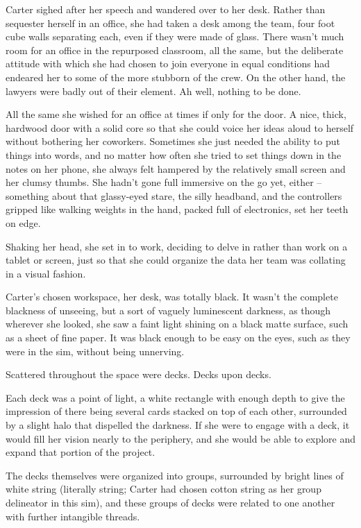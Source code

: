 Carter sighed after her speech and wandered over to her desk. Rather than sequester herself in an office, she had taken a desk among the team, four foot cube walls separating each, even if they were made of glass. There wasn't much room for an office in the repurposed classroom, all the same, but the deliberate attitude with which she had chosen to join everyone in equal conditions had endeared her to some of the more stubborn of the crew. On the other hand, the lawyers were badly out of their element. Ah well, nothing to be done.

All the same she wished for an office at times if only for the door. A nice, thick, hardwood door with a solid core so that she could voice her ideas aloud to herself without bothering her coworkers. Sometimes she just needed the ability to put things into words, and no matter how often she tried to set things down in the notes on her phone, she always felt hampered by the relatively small screen and her clumsy thumbs. She hadn't gone full immersive on the go yet, either -- something about that glassy-eyed stare, the silly headband, and the controllers gripped like walking weights in the hand, packed full of electronics, set her teeth on edge.

Shaking her head, she set in to work, deciding to delve in rather than work on a tablet or screen, just so that she could organize the data her team was collating in a visual fashion.

Carter's chosen workspace, her desk, was totally black. It wasn't the complete blackness of unseeing, but a sort of vaguely luminescent darkness, as though wherever she looked, she saw a faint light shining on a black matte surface, such as a sheet of fine paper. It was black enough to be easy on the eyes, such as they were in the sim, without being unnerving.

Scattered throughout the space were decks. Decks upon decks.

Each deck was a point of light, a white rectangle with enough depth to give the impression of there being several cards stacked on top of each other, surrounded by a slight halo that dispelled the darkness. If she were to engage with a deck, it would fill her vision nearly to the periphery, and she would be able to explore and expand that portion of the project.

The decks themselves were organized into groups, surrounded by bright lines of white string (literally string; Carter had chosen cotton string as her group delineator in this sim), and these groups of decks were related to one another with further intangible threads.

